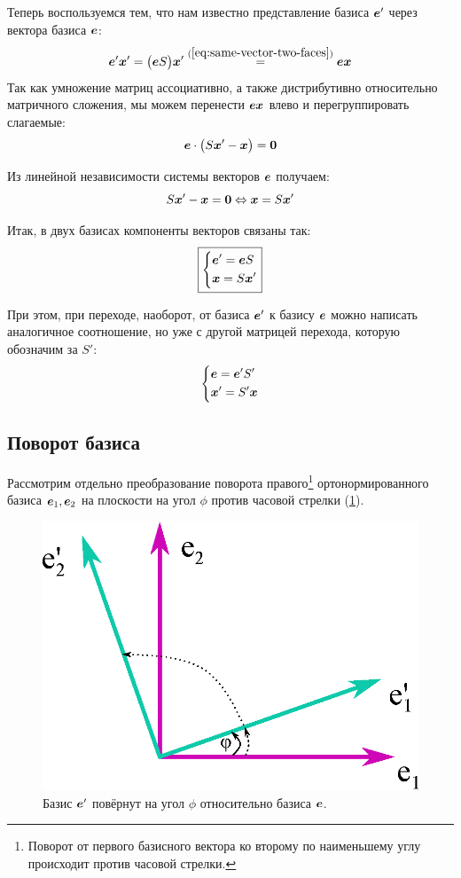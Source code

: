\documentclass[a4paper,12pt]{article}
\begin{document}
  Теперь воспользуемся тем, что нам известно представление базиса $\boldsymbol e'$ через вектора базиса $\boldsymbol e$:
  \[
    \boldsymbol e' \boldsymbol x' = \bigl(\boldsymbol e S\bigr) \boldsymbol x'
      \stackrel{(\ref{eq:same-vector-two-faces})}{=} \boldsymbol e \boldsymbol x
  \]
  Так как умножение матриц ассоциативно, а также дистрибутивно относительно матричного сложения, мы можем перенести $\boldsymbol e \boldsymbol x$ влево и перегруппировать слагаемые:
  \[
    \boldsymbol e \cdot \bigl(S \boldsymbol x' - \boldsymbol x\bigr) = \boldsymbol 0
  \]
  
  Из линейной независимости системы векторов $\boldsymbol e$ получаем:
  \[
    S \boldsymbol x' - \boldsymbol x = \boldsymbol 0 \Leftrightarrow \boldsymbol x = S \boldsymbol x'
  \]
  
  Итак, в двух базисах компоненты векторов связаны так:
  \begin{equation}\label{eq:vector1-to-vector2}
    \boxed{
      \left\{
        \begin{aligned}
          &\boldsymbol e' = \boldsymbol e S\\
          &\boldsymbol x = S \boldsymbol x'
        \end{aligned}
      \right.
    }
  \end{equation}
  
  При этом, при переходе, наоборот, от базиса $\boldsymbol e'$ к базису $\boldsymbol e$ можно написать аналогичное соотношение, но уже с другой матрицей перехода, которую обозначим за $S'$:
  \[
    \left\{
      \begin{aligned}
        &\boldsymbol e = \boldsymbol e' S'\\
        &\boldsymbol x' = S' \boldsymbol x
      \end{aligned}
    \right.
  \]
  
  
  \subsection{Поворот базиса}
  
  Рассмотрим отдельно преобразование поворота правого\footnote{Поворот от первого базисного вектора ко второму по наименьшему углу происходит против часовой стрелки.} ортонормированного базиса $\boldsymbol e_1, \boldsymbol e_2$ на плоскости на угол $\phi$ против часовой стрелки (\ref{fig:turned-ortonorm-basis}).

  \begin{figure}[h]
    \centering
    
    \includegraphics[width=0.4\columnwidth]{turned-ortonorm-basis}
    
    \caption{Базис $\boldsymbol e'$ повёрнут на угол $\phi$ относительно базиса $\boldsymbol e$.}
    \label{fig:turned-ortonorm-basis}
  \end{figure}
  
\end{document}
